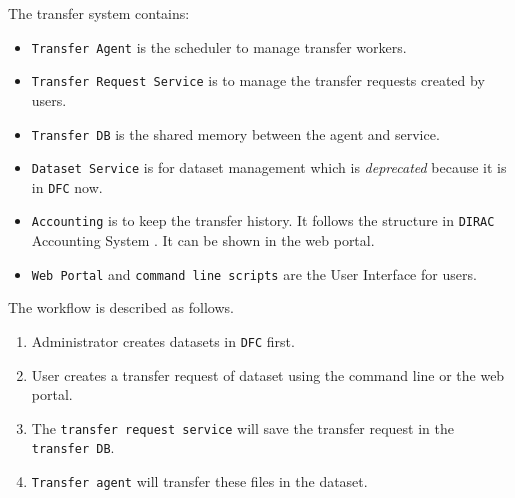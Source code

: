 The transfer system contains:

\begin{itemize}
    \item {\tt Transfer Agent} is the scheduler to manage transfer workers.
    \item {\tt Transfer Request Service} is to manage the transfer requests
          created by users.
    \item {\tt Transfer DB} is the shared memory between the agent and 
          service. 
    \item {\tt Dataset Service} is for dataset management which is 
          {\em deprecated} because it is in {\tt DFC} now.
    \item {\tt Accounting} is to keep the transfer history.
          It follows the structure in {\tt DIRAC} Accounting System
          \cite{bib:diracacct}.
          It can be shown in the web portal.
    \item {\tt Web Portal} and {\tt command line scripts} are the 
          User Interface for users.
\end{itemize}

The workflow is described as follows.

\begin{enumerate}
\item Administrator creates datasets in {\tt DFC} first. 
\item User creates a transfer request of dataset using the command line 
      or the web portal.
\item The {\tt transfer request service} will save the transfer 
      request in the {\tt transfer DB}.
\item {\tt Transfer agent} will transfer these files in the dataset.
\end{enumerate}

